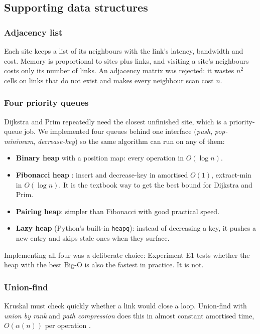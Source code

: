 \subsection{Supporting data structures}
\subsubsection{Adjacency list}
Each site keeps a list of its neighbours with the link's latency, bandwidth and cost. Memory is proportional to sites plus links, and visiting a site's neighbours costs only its number of links. An adjacency matrix was rejected: it wastes $n^2$ cells on links that do not exist and makes every neighbour scan cost $n$.

\subsubsection{Four priority queues}
Dijkstra and Prim repeatedly need the closest unfinished site, which is a priority-queue job. We implemented four queues behind one interface (\emph{push}, \emph{pop-minimum}, \emph{decrease-key}) so the same algorithm can run on any of them:
\begin{itemize}[leftmargin=*]
  \item \textbf{Binary heap} with a position map: every operation in $O(\log n)$.
  \item \textbf{Fibonacci heap} \cite{fredman1987}: insert and decrease-key in amortised $O(1)$, extract-min in $O(\log n)$. It is the textbook way to get the best bound for Dijkstra and Prim.
  \item \textbf{Pairing heap}: simpler than Fibonacci with good practical speed.
  \item \textbf{Lazy heap} (Python's built-in \texttt{heapq}): instead of decreasing a key, it pushes a new entry and skips stale ones when they surface.
\end{itemize}
Implementing all four was a deliberate choice: Experiment E1 tests whether the heap with the best Big-O is also the fastest in practice. It is not.

\subsubsection{Union-find}
Kruskal must check quickly whether a link would close a loop. Union-find with \emph{union by rank} and \emph{path compression} does this in almost constant amortised time, $O(\alpha(n))$ per operation \cite{tarjan1975}.

